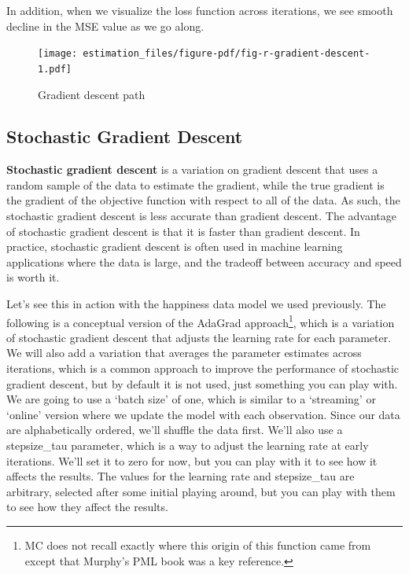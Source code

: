 \documentclass[
  letterpaper,
]{krantz}
\begin{document}
In addition, when we visualize the loss function across iterations, we
see smooth decline in the MSE value as we go along.

\begin{figure}

{\centering \texttt{[image: estimation\_files/figure-pdf/fig-r-gradient-descent-1.pdf]}

}

\caption{\label{fig-r-gradient-descent}Gradient descent path}

\end{figure}

\subsection{Stochastic Gradient
Descent}\label{stochastic-gradient-descent}

\textbf{Stochastic gradient descent} is a variation on gradient descent
that uses a random sample of the data to estimate the gradient, while
the true gradient is the gradient of the objective function with respect
to all of the data. As such, the stochastic gradient descent is less
accurate than gradient descent. The advantage of stochastic gradient
descent is that it is faster than gradient descent. In practice,
stochastic gradient descent is often used in machine learning
applications where the data is large, and the tradeoff between accuracy
and speed is worth it.

Let's see this in action with the happiness data model we used
previously. The following is a conceptual version of the AdaGrad
approach\footnote{MC does not recall exactly where this origin of this
  function came from except that Murphy's PML book was a key reference.},
which is a variation of stochastic gradient descent that adjusts the
learning rate for each parameter. We will also add a variation that
averages the parameter estimates across iterations, which is a common
approach to improve the performance of stochastic gradient descent, but
by default it is not used, just something you can play with. We are
going to use a `batch size' of one, which is similar to a `streaming' or
`online' version where we update the model with each observation. Since
our data are alphabetically ordered, we'll shuffle the data first. We'll
also use a stepsize\_tau parameter, which is a way to adjust the
learning rate at early iterations. We'll set it to zero for now, but you
can play with it to see how it affects the results. The values for the
learning rate and stepsize\_tau are arbitrary, selected after some
initial playing around, but you can play with them to see how they
affect the results.
\end{document}
